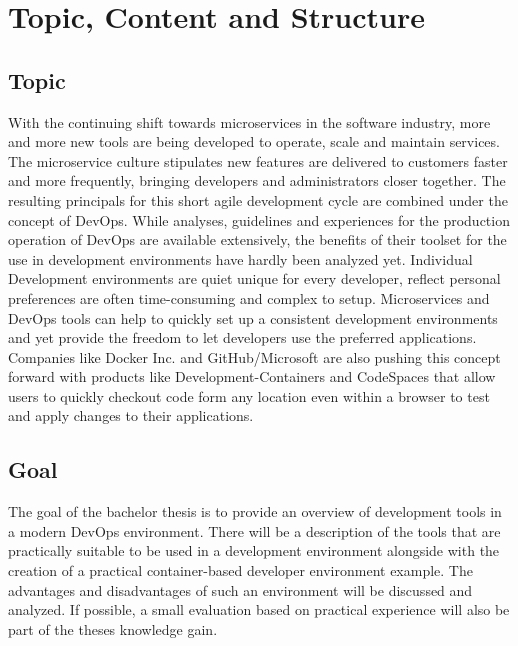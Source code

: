 \documentclass[12pt, a4paper]{article}
\begin{document}
\nocite{*}



\tableofcontents
\newpage
{}
\setcounter{lastroman}{\value{page}}

\pagestyle{plain}

\section{Topic, Content and Structure}
\subsection{Topic}
With the continuing shift towards microservices in the software industry, more and more new tools are being developed to operate, scale and maintain services. The microservice culture stipulates new features are delivered to customers faster and more frequently, bringing developers and administrators closer together. The resulting principals for this short agile development cycle are combined under the concept of DevOps. While analyses, guidelines and experiences for the production operation of DevOps are available extensively, the benefits of their toolset for the use in development environments have hardly been analyzed yet.\newline
Individual Development environments are quiet unique for every developer, reflect personal preferences are often time-consuming and complex to setup. Microservices and DevOps tools can help to quickly set up a consistent development environments and yet provide the freedom to let developers use the preferred applications. Companies like Docker Inc. and GitHub/Microsoft are also pushing this concept forward with products like Development-Containers and CodeSpaces that allow users to quickly checkout code form any location even within a browser to test and apply changes to their applications.
\subsection{Goal}
The goal of the bachelor thesis is to provide an overview of development tools in a modern DevOps environment. There will be a description of the tools that are practically suitable to be used in a development environment alongside with the creation of a practical container-based developer environment example. The advantages and disadvantages of such an environment will be discussed and analyzed. If possible, a small evaluation based on practical experience will also be part of the theses knowledge gain.
\end{document}

